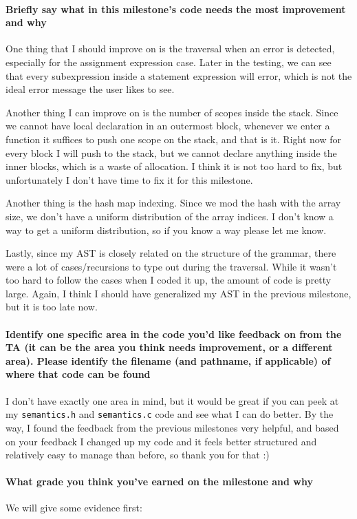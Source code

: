 \documentclass{article}
\begin{document}
\paragraph{Briefly say what in this milestone's code needs the most improvement and why}
One thing that I should improve on is the traversal when an error is detected, especially for the assignment expression case. Later in the testing, we can see that every subexpression inside a statement expression will error, which is not the ideal error message the user likes to see. 

Another thing I can improve on is the number of scopes inside the stack. Since we cannot have local declaration in an outermost block, whenever we enter a function it suffices to push one scope on the stack, and that is it. Right now for every block I will push to the stack, but we cannot declare anything inside the inner blocks, which is a waste of allocation. I think it is not too hard to fix, but unfortunately I don't have time to fix it for this milestone.

Another thing is the hash map indexing. Since we mod the hash with the array size, we don't have a uniform distribution of the array indices. I don't know a way to get a uniform distribution, so if you know a way please let me know.

Lastly, since my AST is closely related on the structure of the grammar, there were a lot of cases/recursions to type out during the traversal. While it wasn't too hard to follow the cases when I coded it up, the amount of code is pretty large. Again, I think I should have generalized my AST in the previous milestone, but it is too late now.

\paragraph{Identify one specific area in the code you'd like feedback on from the TA (it can be the area you think needs improvement, or a different area). Please identify the filename (and pathname, if applicable) of where that code can be found}
I don't have exactly one area in mind, but it would be great if you can peek at my \verb|semantics.h| and \verb|semantics.c| code and see what I can do better. By the way, I found the feedback from the previous milestones very helpful, and based on your feedback I changed up my code and it feels better structured and relatively easy to manage than before, so thank you for that :)

\paragraph{What grade you think you've earned on the milestone and why}
We will give some evidence first:
\end{document}
